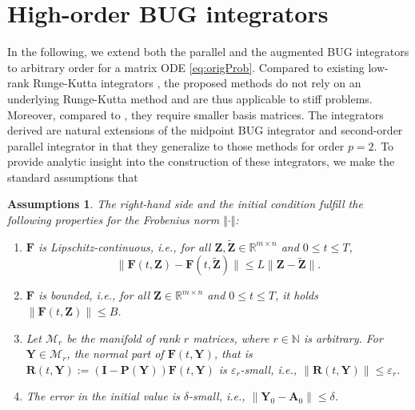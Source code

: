 \documentclass[preprint,runningheads]{svjour3}
\newtheorem{assumptions}{Assumptions}
\newcommand\bfI{{\mathbf I}}
\newcommand\bfA{{\mathbf A}}
\newcommand\bfF{{\mathbf F}}
\newcommand\bfP{{\mathbf P}}
\newcommand\bfR{{\mathbf R}}
\newcommand\bfY{{\mathbf Y}}
\newcommand\bfZ{{\mathbf Z}}
\begin{document}
\section{High-order BUG integrators} \label{sec:high_order_bug}
In the following, we extend both the parallel \cite{CeKL23} and the augmented BUG integrators \cite{ceruti2023rank} to arbitrary order for a matrix ODE \eqref{eq:origProb}. Compared to existing low-rank Runge-Kutta integrators \cite{KiV19,nobile2025robust}, the proposed methods do not rely on an underlying Runge-Kutta method and are thus applicable to stiff problems. Moreover, compared to \cite{nobile2025robust}, they require smaller basis matrices. The integrators derived are natural extensions of the midpoint BUG integrator \cite{ceruti2024robust} and second-order parallel integrator \cite{kusch2024second} in that they generalize to those methods for order $p=2$. 
To provide analytic insight into the construction of these integrators, we make the standard assumptions that 
\begin{assumptions}\label{as:assumptions}
The right-hand side and the initial condition fulfill the following properties for the Frobenius norm $\Vert\cdot \Vert$:
\begin{enumerate}[label=A\arabic*, ref=A\arabic*]
	\item $\bfF$ is Lipschitz-continuous, i.e., for all $\bfZ, \widetilde{\bfZ} \in \mathbb{R}^{m \times n}$ and $0\le t \le T$,
    $$
    \| \bfF(t, \bfZ) - \bfF(t, \widetilde{\bfZ}) \| 
    \leq
    L \| \bfZ - \widetilde{\bfZ} \|.
    $$	\label{ass:Lipschitz}
    \item $\bfF$ is bounded, i.e., for all $\bfZ \in \mathbb{R}^{m \times n}$ and $0\le t \le T$, it holds $\| \bfF(t, \bfZ) \| \leq B$.\label{ass:bounded}
    \item Let $\mathcal{M}_r$ be the manifold of rank $r$ matrices, where $r\in\mathbb{N}$ is arbitrary. 
    For $\bfY\in\mathcal{M}_r$, the normal part of $\bfF(t, \bfY)$, that is $\bfR(t, \bfY) := (\bfI - 
    \bfP(\bfY))\bfF(t, \bfY)$ is $\varepsilon_r$-small, i.e., $\| \bfR(t, \bfY) \| \leq \varepsilon_r$. 
    \label{ass:epsilon}
    \item
    The error in the initial value is $\delta$-small, i.e., $\| \bfY_0 - \bfA_0 \| \le \delta$.
     \label{ass:IC}
\end{enumerate}	
\end{assumptions}
\end{document}
